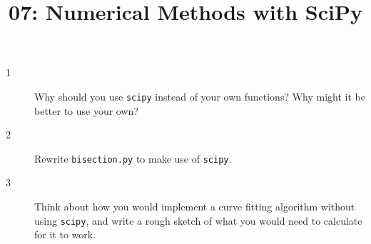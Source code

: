 \documentclass[10pt]{amsart}
\title{07: Numerical Methods with SciPy}
\begin{document}
\maketitle

\begin{description}
\item[1] Why should you use \verb+scipy+ instead of your own functions? Why
might it be better to use your own?
\vspace{0.75in}

\item[2] Rewrite \verb+bisection.py+ to make use of \verb+scipy+.
\vspace{0.75in}

\item[3] Think about how you would implement a curve fitting algorithm without
using \verb+scipy+, and write a rough sketch of what you would need to calculate
for it to work.
\vspace{0.75in}


\end{description}
\end{document}
